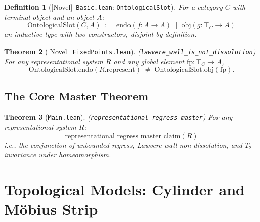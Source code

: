 \documentclass[11pt]{article}
\newtheorem{theorem}{Theorem}[section]
\newtheorem{definition}[theorem]{Definition}
\newcommand{\leanref}[1]{\texttt{\small #1}}
\newcommand{\novel}{\textcolor{blue!70!black}{[Novel]}}
\begin{document}
\begin{definition}[\novel\ \leanref{Basic.lean}: \leanref{OntologicalSlot}]
\label{def:ontoslot}
For a category $C$ with terminal object and an object $A$:
\[
\mathrm{OntologicalSlot}(C, A) \;:=\;
  \mathrm{endo}(f : A \to A) \;\mid\; \mathrm{obj}(g : \top_C \to A)
\]
an inductive type with two constructors, disjoint by definition.
\end{definition}

\begin{theorem}[\novel\ \leanref{FixedPoints.lean}]
\label{thm:wall}
(\leanref{lawvere\_wall\_is\_not\_dissolution}) For any representational system $R$ and any global element $\mathrm{fp} : \top_C \to A$,
\[
  \mathrm{OntologicalSlot.endo}(R.\mathrm{represent}) \;\neq\; \mathrm{OntologicalSlot.obj}(\mathrm{fp}).
\]
\end{theorem}

%

\subsection{The Core Master Theorem}

\begin{theorem}[\leanref{Main.lean}]
\label{thm:master}
(\leanref{representational\_regress\_master}) For any representational system $R$:
\[
  \mathrm{representational\_regress\_master\_claim}(R)
\]
i.e., the conjunction of unbounded regress, Lawvere wall non-dissolution, and $T_2$ invariance under homeomorphism.
\end{theorem}


\section{Topological Models: Cylinder and M\"obius Strip}
\label{sec:models}
\end{document}
